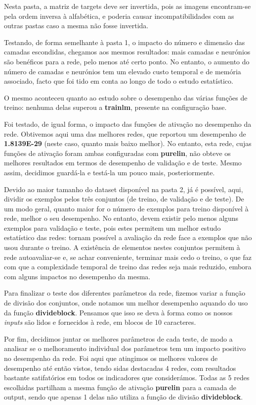 \documentclass[11pt]{article}
\begin{document}
	Nesta pasta, a matriz de targets deve ser invertida, pois as imagens encontram-se pela ordem inversa à alfabética, e poderia causar incompatibilidades com as outras pastas caso a mesma não fosse invertida.
	
	Testando, de forma semelhante à pasta 1, o impacto do número e dimensão das camadas escondidas, chegamos aos mesmos resultados: mais camadas e neurónios são benéficos para a rede, pelo menos até certo ponto. No entanto, o aumento do número de camadas e neurónios tem um elevado custo temporal e de memória associado, facto que foi tido em conta ao longo de todo o estudo estatístico.
	
	O mesmo aconteceu quanto ao estudo sobre o desempenho das várias funções de treino: nenhuma delas superou a \textbf{trainlm}, presente na configuração base.
	
	Foi testado, de igual forma, o impacto das funções de ativação no desempenho da rede. Obtivemos aqui uma das melhores redes, que reportou um desempenho de \textbf{1.8139E-29} (neste caso, quanto mais baixo melhor). No entanto, esta rede, cujas funções de ativação foram ambas configuradas com \textbf{purelin}, não obteve os melhores resultados em termos de desempenho de validação e de teste. Mesmo assim, decidimos guardá-la e testá-la um pouco mais, posteriormente.
	
	Devido ao maior tamanho do dataset disponível na pasta 2, já é possível, aqui, dividir os exemplos pelos três conjuntos (de treino, de validação e de teste). De um modo geral, quanto maior for o número de exemplos para treino disponível à rede, melhor o seu desempenho. No entanto, devem existir pelo menos alguns exemplos para validação e teste, pois estes permitem um melhor estudo estatístico das redes: tornam possível a avaliação da rede face a exemplos que não usou durante o treino. A existência de elementos nestes conjuntos permitem à rede autoavaliar-se e, se achar conveniente, terminar mais cedo o treino, o que faz com que a complexidade temporal de treino das redes seja mais reduzido, embora com alguns impactos no desempenho da mesma.
	
	Para finalizar o teste dos diferentes parâmetros da rede, fizemos variar a função de divisão dos conjuntos, onde notamos um melhor desempenho aquando do uso da função \textbf{divideblock}. Pensamos que isso se deva à forma como os nossos \textit{inputs} são lidos e fornecidos à rede, em blocos de 10 caracteres.
	
	Por fim, decidimos juntar os melhores parâmetros de cada teste, de modo a analisar se o melhoramento individual dos parâmetros tem um impacto positivo no desempenho da rede. Foi aqui que atingimos os melhores valores de desempenho até então vistos, tendo sidas destacadas 4 redes, com resultados bastante satifatórios em todos os indicadores que considerámos. Todas as 5 redes escolhidas partilham a mesma função de ativação \textbf{purelin} para a camada de output, sendo que apenas 1 delas não utiliza a função de divisão \textbf{divideblock}.
	
\end{document}
